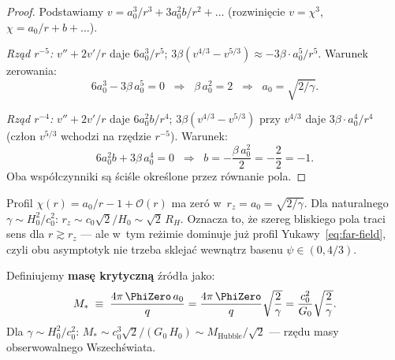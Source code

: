 \begin{proof}
Podstawiamy $v = a_0^3/r^3 + 3a_0^2 b/r^2 + \ldots$
(rozwini\k{e}cie $v = \chi^3$, $\chi = a_0/r + b + \ldots$).

\medskip\noindent
\emph{Rz\k{a}d $r^{-5}$:}
$v''+2v'/r$ daje $6a_0^3/r^5$;
$3\beta(v^{4/3}-v^{5/3}) \approx -3\beta\cdot a_0^5/r^5$.
Warunek zerowania:
\[
  6a_0^3 - 3\beta\,a_0^5 = 0
  \;\;\Longrightarrow\;\;
  \beta\,a_0^2 = 2
  \;\;\Longrightarrow\;\;
  a_0 = \sqrt{2/\gamma}.
\]

\medskip\noindent
\emph{Rz\k{a}d $r^{-4}$:}
$v''+2v'/r$ daje $6a_0^2 b/r^4$;
$3\beta(v^{4/3}-v^{5/3})$ przy $v^{4/3}$ daje
$3\beta\cdot a_0^4/r^4$ (cz\l{}on $v^{5/3}$ wchodzi na rz\k{e}dzie $r^{-5}$).
Warunek:
\[
  6a_0^2 b + 3\beta\,a_0^4 = 0
  \;\;\Longrightarrow\;\;
  b = -\frac{\beta\,a_0^2}{2} = -\frac{2}{2} = -1.
\]
Oba wsp\'o\l{}czynniki s\k{a} \'sci\'sle okre\'slone przez r\'ownanie pola.
\end{proof}

\begin{remark}[Interpretacja wyrazu sta\l{}ego $b=-1$]%
\label{rem:b-minus-one}
Profil $\chi(r) = a_0/r - 1 + \mathcal{O}(r)$ ma zer\'o
w~$r_z = a_0 = \sqrt{2/\gamma}$.
Dla naturalnego $\gamma \sim H_0^2/c_0^2$:
$r_z \sim c_0\sqrt{2}/H_0 \sim \sqrt{2}\,R_H$.
Oznacza to, \.ze szereg bliskiego pola traci sens dla
$r \gtrsim r_z$ --- ale w~tym re\.zimie dominuje ju\.z
profil Yukawy~\eqref{eq:far-field},
czyli obu asymptotyk nie trzeba sklejać wewnątrz basenu
$\psi \in (0, 4/3)$.
\end{remark}

\begin{definition}\label{def:critical-mass}
Definiujemy \textbf{mas\k{e} krytyczn\k{a}} \'zr\'od\l{}a jako:
\begin{equation}\label{eq:Mcrit}
  M_* \;\equiv\; \frac{4\pi\,\PhiZero\,a_0}{q}
  = \frac{4\pi\,\PhiZero}{q}\sqrt{\frac{2}{\gamma}}
  = \frac{c_0^2}{G_0}\sqrt{\frac{2}{\gamma}}.
\end{equation}
Dla $\gamma \sim H_0^2/c_0^2$: $M_* \sim c_0^3\sqrt{2}/(G_0\,H_0)
\sim M_{\mathrm{Hubble}}/\sqrt{2}$
--- rz\k{e}du masy obserwowalnego Wszech\'swiata.
\end{definition}

